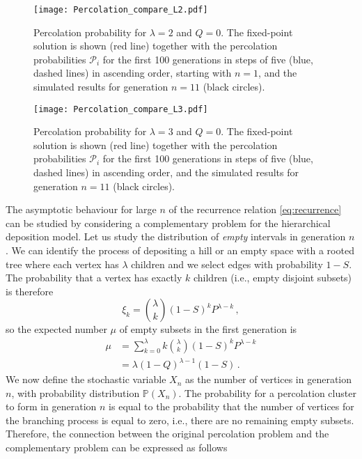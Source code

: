 \documentclass[amsmath,amssymb,amsfonts,aps,pre,preprint,superscriptaddress,bibnotes,showpacs,showkeys,longbibliography,nofootinbib]{revtex4-1}
\begin{document}
\begin{figure}[!htp]
    \centering
    \texttt{[image: Percolation\_compare\_L2.pdf]}
    \caption{Percolation probability for $\lambda = 2$ and $Q=0$. The fixed-point solution is shown (red line) together with the percolation probabilities $\mathcal{P}_i$ for the first 100 generations in steps of five (blue, dashed lines) in ascending order, starting with $n=1$, and the simulated results for generation $n=11$ (black circles).}
    \label{fig:recurrence_2}
\end{figure}
\begin{figure}[!htp]
    \centering
    \texttt{[image: Percolation\_compare\_L3.pdf]}
    \caption{Percolation probability for $\lambda = 3$ and $Q=0$. The fixed-point solution is shown (red line) together with the percolation probabilities $\mathcal{P}_i$ for the first 100 generations in steps of five (blue, dashed lines) in ascending order, and the simulated results for generation $n=11$ (black circles).}
    \label{fig:recurrence_3}
\end{figure}
The asymptotic behaviour for large $n$ of the recurrence relation \eqref{eq:recurrence} can be studied by considering a complementary problem for the hierarchical deposition model. Let us study the distribution of \textsl{empty} intervals in  generation $n$. We can identify the process of depositing a hill or an empty space with a rooted tree \cite{progress} where each vertex has $\lambda$ children and we select edges with probability $1-S$. The probability that a vertex has exactly $k$ children (i.e., empty disjoint subsets) is therefore
\begin{equation}
    \label{eq:prob_k_children}
    \xi_k = {\lambda \choose k} (1-S)^k P^{\lambda-k}\, ,
\end{equation}
so the expected number $\mu$ of empty subsets in the first generation is
\begin{equation}
    \label{eq:mean}
    \begin{split}
    \mu &= \sum\limits_{k=0}^\lambda k {\lambda \choose k} (1-S)^k P^{\lambda-k}\\
    &= \lambda (1-Q)^{\lambda-1}(1-S)\, .
    \end{split}
\end{equation}
We now define the stochastic variable $X_n$ as the number of vertices in generation $n$, with probability distribution $\mathbb{P}(X_n)$. The probability for a percolation cluster to form in generation $n$ is equal to the probability that the number of vertices for the branching process is equal to zero, i.e., there are no remaining empty subsets. Therefore, the connection between the original percolation problem and the complementary problem can be expressed as follows
\end{document}
